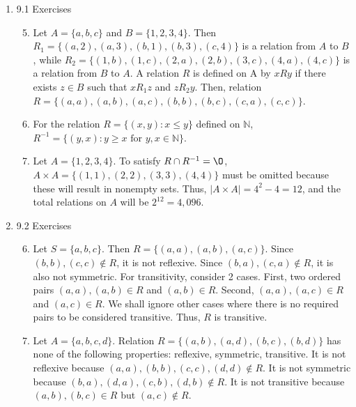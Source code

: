 \documentclass[12pt]{article}
\begin{document}
\begin{enumerate}
\item {\large 9.1 Exercises}
\begin{enumerate}
\setcounter{enumi}{4}
	\item 
	 Let $A = \{a, b, c\}$ and $B = \{1, 2, 3, 4\}$. Then $R_1 = \{(a, 2), (a, 3), (b, 1),
	  (b, 3), (c, 4)\}$ is a relation from $A$ to $B$, while $R_2 = \{(1, b), (1, c), (2, a), (2, b), (3, c), (4, a), (4, c)\}$ is a relation from $B$ to $A$. A relation $R$ is defined on A by $xRy$ if there exists $z \in B$ such that $x R_1 z$ and $z R_2 y$. Then, relation $R=\{(a,a),(a,b),(a,c),(b,b),(b,c),(c,a),(c,c)\}$.\\
	\item
	For the relation $R = \{(x,y) : x \leq y\}$ defined on $\mathbb{N}$, $R^{-1}=\{(y,x) : y\geq x \text{ for } y,x\in\mathbb{N}\}$.\\
	\item
	Let $A=\{1,2,3,4\}$. To satisfy $R\cap R^{-1} = \O$,  $A\times A=\{(1,1),(2,2),
	(3,3),(4,4)\}$ must be omitted because these will result in nonempty sets. Thus, $|A\times A|=4^2-4=12$, and the total relations on $A$ will be $2^{12}=4,096$. \\
	
\end{enumerate}


\item {\large 9.2 Exercises}
\begin{enumerate}

\setcounter{enumi}{5}
	\item
	Let $S = \{a, b, c\}$. Then $R = \{(a, a), (a, b), (a, c)\}$. Since $(b,b),(c,c)\notin R$, it is not reflexive. Since $(b,a),(c,a)\notin R$, it is also not symmetric. For transitivity, consider 2 cases. First, two ordered pairs $(a,a),(a,b)\in R$ and $(a,b)\in R$. Second, $(a,a),(a,c)\in R$ and $(a,c)\in R$. We shall ignore other cases where there is no required pairs to be considered transitive. Thus, $R$ is transitive.\\
	
	\item
	Let $A=\{a,b,c,d\}$. Relation $R=\{(a,b),(a,d),(b,c),(b,d)\}$ has none of the following properties: reflexive, symmetric, transitive. It is not reflexive because $(a,a),(b,b),(c,c),(d,d)\notin R$. It is not symmetric because $(b,a),(d,a),(c,b),(d,b)\notin R$. It is not transitive because $(a,b),(b,c)\in R$ but $(a,c)\notin R$.\\


\end{enumerate}
\end{enumerate}
\end{document}
